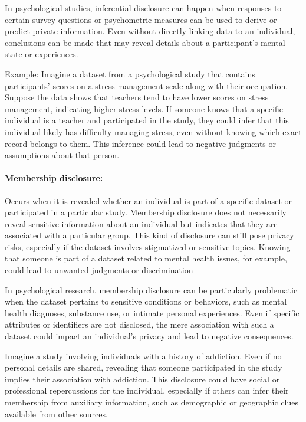\documentclass{article}
\begin{document}
In psychological studies, inferential disclosure can happen when responses to certain survey questions or psychometric measures can be used to derive or predict private information. Even without directly linking data to an individual, conclusions can be made that may reveal details about a participant’s mental state or experiences.

Example:
Imagine a dataset from a psychological study that contains participants' scores on a stress management scale along with their occupation. Suppose the data shows that teachers tend to have lower scores on stress management, indicating higher stress levels. If someone knows that a specific individual is a teacher and participated in the study, they could infer that this individual likely has difficulty managing stress, even without knowing which exact record belongs to them. This inference could lead to negative judgments or assumptions about that person.

\paragraph{Membership disclosure:}
Occurs when it is revealed whether an individual is part of a specific dataset or participated in a particular study. Membership disclosure does not necessarily reveal sensitive information about an individual but indicates that they are associated with a particular group. This kind of disclosure can still pose privacy risks, especially if the dataset involves stigmatized or sensitive topics. Knowing that someone is part of a dataset related to mental health issues, for example, could lead to unwanted judgments or discrimination

In psychological research, membership disclosure can be particularly problematic when the dataset pertains to sensitive conditions or behaviors, such as mental health diagnoses, substance use, or intimate personal experiences. Even if specific attributes or identifiers are not disclosed, the mere association with such a dataset could impact an individual’s privacy and lead to negative consequences.

Imagine a study involving individuals with a history of addiction. Even if no personal details are shared, revealing that someone participated in the study implies their association with addiction. This disclosure could have social or professional repercussions for the individual, especially if others can infer their membership from auxiliary information, such as demographic or geographic clues available from other sources.
\end{document}
